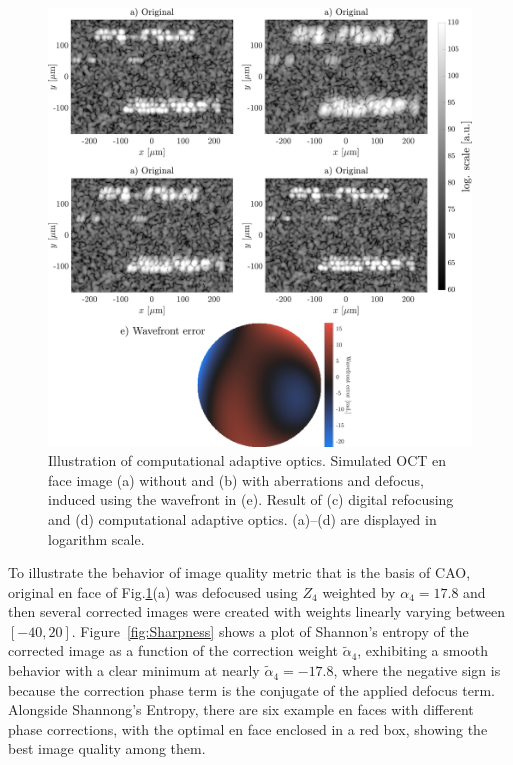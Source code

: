 \begin{figure}[htb!]
	\centering
	\includegraphics[width=\textwidth]{Figures/TheoreticalBasis/CAO.pdf}
	\caption{Illustration of computational adaptive optics. Simulated OCT en face image (a) without and (b) with aberrations and defocus, induced using the wavefront in (e). Result of (c) digital refocusing and (d) computational adaptive optics. (a)--(d) are displayed in logarithm scale.}
	\label{fig:CAO}
\end{figure}

To illustrate the behavior of image quality metric that is the basis of CAO, original en face of Fig.\ref{fig:CAO}(a) was defocused using $Z_4$ weighted by $\alpha_4=17.8$ and then several corrected images were created with weights linearly varying between $[-40, 20]$. Figure~\ref{fig:Sharpness} shows a plot of Shannon's entropy of the corrected image as a function of the correction weight $\tilde{\alpha}_4$, exhibiting a smooth behavior with a clear minimum at nearly $\tilde{\alpha}_4=-17.8$, where the negative sign is because the correction phase term is the conjugate of the applied defocus term. Alongside Shannong's Entropy, there are six example en faces with different phase corrections, with the optimal en face enclosed in a red box, showing the best image quality among them.

